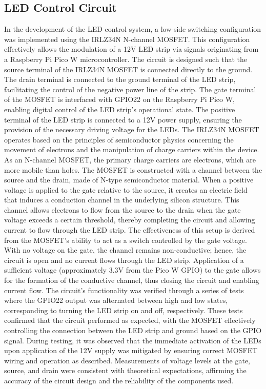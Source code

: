 \documentclass[12pt]{article} %
\begin{document}
\pagebreak
\subsection{LED Control Circuit}
\noindent In the development of the LED control system, a low-side switching configuration was implemented using the IRLZ34N N-channel MOSFET. This configuration effectively allows the modulation of a 12V LED strip via signals originating from a Raspberry Pi Pico W microcontroller. The circuit is designed such that the source terminal of the IRLZ34N MOSFET is connected directly to the ground. The drain terminal is connected to the ground terminal of the LED strip, facilitating the control of the negative power line of the strip. The gate terminal of the MOSFET is interfaced with GPIO22 on the Raspberry Pi Pico W, enabling digital control of the LED strip’s operational state. The positive terminal of the LED strip is connected to a 12V power supply, ensuring the provision of the necessary driving voltage for the LEDs.
\newline
\newline
\noindent The IRLZ34N MOSFET \cite{ref_mosfet} operates based on the principles of semiconductor physics concerning the movement of electrons and the manipulation of charge carriers within the device. As an N-channel MOSFET, the primary charge carriers are electrons, which are more mobile than holes. The MOSFET is constructed with a channel between the source and the drain, made of N-type semiconductor material. When a positive voltage is applied to the gate relative to the source, it creates an electric field that induces a conduction channel in the underlying silicon structure. This channel allows electrons to flow from the source to the drain when the gate voltage exceeds a certain threshold, thereby completing the circuit and allowing current to flow through the LED strip.
\newline
\newline
\noindent The effectiveness of this setup is derived from the MOSFET's ability to act as a switch controlled by the gate voltage. With no voltage on the gate, the channel remains non-conductive; hence, the circuit is open and no current flows through the LED strip. Application of a sufficient voltage (approximately 3.3V from the Pico W GPIO) to the gate allows for the formation of the conductive channel, thus closing the circuit and enabling current flow.
\newline
\newline
\noindent The circuit's functionality was verified through a series of tests where the GPIO22 output was alternated between high and low states, corresponding to turning the LED strip on and off, respectively. These tests confirmed that the circuit performed as expected, with the MOSFET effectively controlling the connection between the LED strip and ground based on the GPIO signal. During testing, it was observed that the immediate activation of the LEDs upon application of the 12V supply was mitigated by ensuring correct MOSFET wiring and operation as described. Measurements of voltage levels at the gate, source, and drain were consistent with theoretical expectations, affirming the accuracy of the circuit design and the reliability of the components used.
\end{document}
